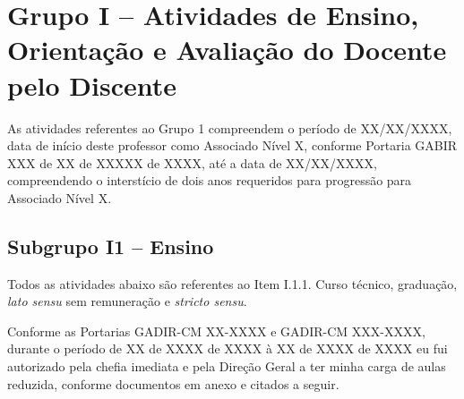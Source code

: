 \section{Grupo I -- Atividades de Ensino, Orientação e Avaliação do Docente pelo Discente}

As atividades referentes ao Grupo 1 compreendem o período de XX/XX/XXXX, data de início deste professor como Associado Nível X, conforme Portaria GABIR XXX de XX de XXXXX de XXXX, até a data de XX/XX/XXXX, compreendendo o interstício de dois anos requeridos para progressão para Associado Nível X.

\subsection{Subgrupo I1 -- Ensino}

Todos as atividades abaixo são referentes ao Item I.1.1. Curso técnico, graduação, \textit{lato sensu} sem remuneração e \textit{stricto sensu}.

Conforme as Portarias GADIR-CM XX-XXXX e GADIR-CM XXX-XXXX, durante o período de XX de XXXX de XXXX à XX de XXXX de XXXX eu fui autorizado pela chefia imediata e pela Direção Geral a ter minha carga de aulas reduzida, conforme documentos em anexo e citados a seguir.

